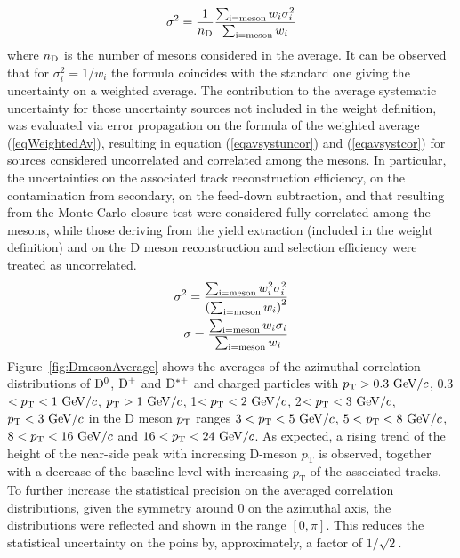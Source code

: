\begin{equation}
  \sigma^{2}=\frac{1}{n_{\rm D}}\frac{\sum_{\rm i=meson}w_{i}\sigma^{2}_{i}}{\sum_{\rm i=meson}w_{i}}
\end{equation}
where $n_{\rm D}$ is the number of mesons considered in the average.
It can be observed that for $\sigma^{2}_{i}=1/w_{i}$ the formula coincides with the standard one giving the uncertainty on a weighted average.
The contribution to the average systematic uncertainty for those uncertainty sources not included in the weight definition, was evaluated via error propagation on the formula of the weighted average (\ref{eqWeightedAv}), resulting in equation (\ref{eqavsystuncor}) and (\ref{eqavsystcor}) for sources
considered uncorrelated and correlated among the mesons. In particular, the uncertainties on the associated track reconstruction efficiency, on the
contamination from secondary, on the feed-down subtraction, and that resulting from the Monte Carlo closure test were considered fully correlated among
the mesons, while those deriving from the yield extraction (included in the weight definition) and on the D meson reconstruction and selection efficiency were treated as uncorrelated.
\begin{eqnarray}
  \sigma^{2}=\frac{\sum_{\rm i=meson}w_{i}^{2}\sigma^{2}_{i}}{\left( \sum_{\rm i=meson}w_{i}\right)^{2}}  \label{eqavsystuncor}\\
  \sigma=\frac{\sum_{\rm i=meson}w_{i}\sigma_{i}}{ \sum_{\rm i=meson}w_{i}}   \label{eqavsystcor}
\end{eqnarray}
Figure~\ref{fig:DmesonAverage} shows the averages of the azimuthal correlation distributions of ${\rm D^0}$, ${\rm D^+}$ and ${\rm D^{*+}}$ and charged particles with $p_{\rm T}>0.3~\mathrm{GeV}/c$, 0.3$<p_{\rm T}<1~\mathrm{GeV}/c$, $p_{\rm T}>1~\mathrm{GeV}/c$, 1$<p_{\rm T}<2~\mathrm{GeV}/c$, 2$<p_{\rm T}<3~\mathrm{GeV}/c$, $p_{\rm T}<3~\mathrm{GeV}/c$ in the D meson $p_{\rm T}$ ranges $3<p_{\rm T}<5~\mathrm{GeV}/c$, $5<p_{\rm T}<8~\mathrm{GeV}/c$, $8<p_{\rm T}<16~\mathrm{GeV}/c$ and $16<p_{\rm T}<24~\mathrm{GeV}/c$.
As expected, a rising trend of the height of the near-side peak with increasing D-meson $p_\mathrm{T}$ is observed, together with a decrease of the baseline level with increasing $p_\mathrm{T}$ of the associated tracks.
To further increase the statistical precision on the averaged correlation distributions, given the symmetry around 0 on the azimuthal axis, the distributions were reflected and shown in the range $[0,\pi]$. This reduces the statistical uncertainty on the poins by, approximately, a factor of $1/\sqrt{2}$.
\clearpage

